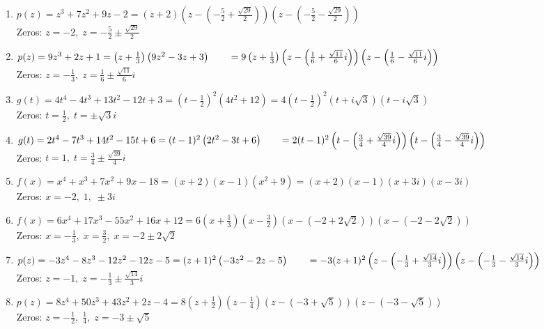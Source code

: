 \documentclass{ximera}
\begin{document}
\begin{enumerate}
\item  $p(z) = z^3 + 7z^2+9z-2 = (z+2) \left(z - \left( -\frac{5}{2}+\frac{\sqrt{29}}{2}\right) \right) \left(z - \left( -\frac{5}{2}-\frac{\sqrt{29}}{2}\right) \right)$ \\
Zeros:  $z = -2, \; z = -\frac{5}{2} \pm \frac{\sqrt{29}}{2}$
\item  $p(z) = 9z^3+2z+1 = \left(z + \frac{1}{3}\right) \left(9z^2 - 3z + 3\right) \\
\phantom{f(z)}= 9\left(z + \frac{1}{3}\right) \left(z - \left(\frac{1}{6} + \frac{\sqrt{11}}{6} i \right) \right) \left(z - \left(\frac{1}{6} - \frac{\sqrt{11}}{6} i \right) \right)$\\
Zeros:  $z = -\frac{1}{3}, \; z = \frac{1}{6} \pm \frac{\sqrt{11}}{6} i$

\item $g(t) = 4t^{4} - 4t^{3} + 13t^{2} - 12t + 3 = \left(t - \frac{1}{2}\right)^{2}\left(4t^{2} + 12\right) = 4\left(t - \frac{1}{2}\right)^{2}(t + i\sqrt{3})(t - i\sqrt{3})$\\
Zeros: $t = \frac{1}{2}, \; t = \pm \sqrt{3}i$
\item $g(t) = 2t^4-7t^3+14t^2-15t+6 = (t-1)^2 \left(2t^2 - 3t + 6\right)  \\
\phantom{f(t)} = 2 (t-1)^2 \left( t - \left( \frac{3}{4} +  \frac{\sqrt{39}}{4} i \right) \right)  \left( t - \left( \frac{3}{4} -  \frac{\sqrt{39}}{4} i \right) \right) $ \\
Zeros: $t = 1, \; t = \frac{3}{4}  \pm  \frac{\sqrt{39}}{4} i$



\item  $f(x) = x^4+x^3+7x^2+9x-18 = (x+2)(x-1)\left(x^2+9\right) = (x+2)(x-1)(x+3i)(x-3i)$\\
Zeros:  $x = -2, \; 1, \; \pm 3i$
\item  $f(x) = 6x^4+17x^3-55x^2+16x+12 = 6 \left(x + \frac{1}{3} \right) \left(x - \frac{3}{2} \right) \left(x - \left( -2 + 2 \sqrt{2}\right)\right) \left(x - \left( -2 - 2 \sqrt{2}\right)\right)$ \\
Zeros:  $x = -\frac{1}{3}, \; x = \frac{3}{2}, \; x = -2 \pm 2 \sqrt{2}$


\item  $p(z) = -3z^4-8z^3-12z^2-12z-5 = (z+1)^2 \left(-3z^2-2z-5\right) \\
\phantom{f(z)}= -3(z+1)^2\left(z - \left( -\frac{1}{3}+\frac{\sqrt{14}}{3} i\right) \right) \left(z - \left( -\frac{1}{3}-\frac{\sqrt{14}}{3} i\right) \right)$ \\
Zeros:  $z = -1, \; z = -\frac{1}{3} \pm \frac{\sqrt{14}}{3} i$
\item  $p(z) = 8z^4+50z^3+43z^2+2z-4 = 8\left(z + \frac{1}{2}\right) \left(z - \frac{1}{4}\right)(z - (-3 + \sqrt{5}))(z - (-3 - \sqrt{5}))$ \\
Zeros:  $z = -\frac{1}{2}, \; \frac{1}{4}, \; z = -3 \pm \sqrt{5}$


\end{enumerate}
\end{document}

